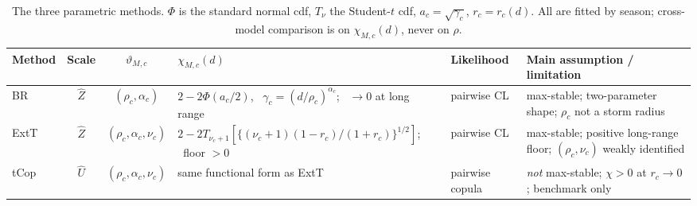 \begin{table}[t]
  \centering
  \caption{The three parametric methods. \(\Phi\) is the standard normal cdf, \(T_\nu\) the Student-\(t\) cdf, \(a_c=\sqrt{\gamma_c}\), \(r_c=r_c(d)\). All are fitted by season; cross-model comparison is on \(\chi_{M,c}(d)\), never on \(\rho\).}
  \label{tab:meth-models}\label{tab:meth-assumptions}
  \footnotesize
  \setlength{\tabcolsep}{4pt}
  \renewcommand{\arraystretch}{1.3}
  \begin{tabular}{@{}l c c p{} l p{}@{}}
    \hline
    Method                                                                             & Scale & \(\vartheta_{M,c}\) & \(\chi_{M,c}(d)\) & Likelihood & Main assumption / limitation \\
    \hline
    BR                                                                                 &
    \(\widehat Z\)                                                                     &
    \((\rho_c,\alpha_c)\)                                                              &
    \(2-2\Phi(a_c/2)\), \ \(\gamma_c=(d/\rho_c)^{\alpha_c}\); \ \(\to0\) at long range &
    pairwise CL                                                                        &
    max-stable; two-parameter shape; \(\rho_c\) not a storm radius                                                                                                                   \\
    ExtT                                                                               &
    \(\widehat Z\)                                                                     &
    \((\rho_c,\alpha_c,\nu_c)\)                                                        &
    \(2-2T_{\nu_c+1}[\{(\nu_c+1)(1-r_c)/(1+r_c)\}^{1/2}]\); \ floor \(>0\)             &
    pairwise CL                                                                        &
    max-stable; positive long-range floor; \((\rho_c,\nu_c)\) weakly identified                                                                                                      \\
    tCop                                                                               &
    \(\widehat U\)                                                                     &
    \((\rho_c,\alpha_c,\nu_c)\)                                                        &
    same functional form as ExtT                                                       &
    pairwise copula                                                                    &
    \emph{not} max-stable; \(\chi>0\) at \(r_c\to0\); benchmark only                                                                                                                 \\
    \hline
  \end{tabular}
\end{table}

